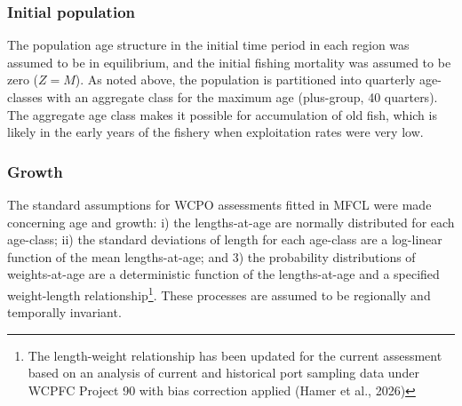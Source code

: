 \documentclass[
  english,
  a4paper,
  a4paper,
  11pt]{SCreport}
\begin{document}
\subsubsection{Initial population}\label{sec-model-initial-population}

The population age structure in the initial time period in each region
was assumed to be in equilibrium, and the initial fishing mortality was
assumed to be zero (\(Z=M\)). As noted above, the population is
partitioned into quarterly age-classes with an aggregate class for the
maximum age (plus-group, 40 quarters). The aggregate age class makes it
possible for accumulation of old fish, which is likely in the early
years of the fishery when exploitation rates were very low.

\subsubsection{Growth}\label{sec-model-growth}

The standard assumptions for WCPO assessments fitted in MFCL were made
concerning age and growth: i) the lengths-at-age are normally
distributed for each age-class; ii) the standard deviations of length
for each age-class are a log-linear function of the mean lengths-at-age;
and 3) the probability distributions of weights-at-age are a
deterministic function of the lengths-at-age and a specified
weight-length relationship\footnote{The length-weight relationship has
  been updated for the current assessment based on an analysis of
  current and historical port sampling data under WCPFC Project 90 with
  bias correction applied (Hamer et al., 2026)}. These processes are
assumed to be regionally and temporally invariant.
\end{document}
